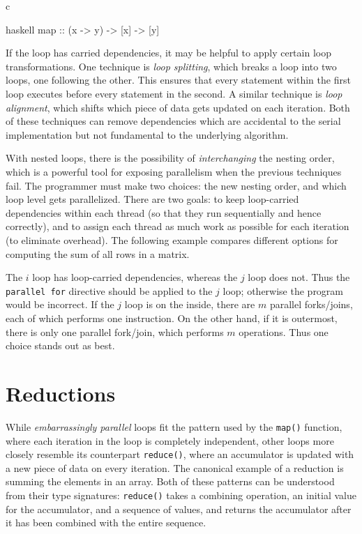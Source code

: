 \documentclass[conference, a4paper]{IEEEtran-modified}
\begin{document}
\begin{ccode}[]{c}
        \begin{ccode}[]
        {haskell}
        map :: (x -> y) -> [x] -> [y]\end{ccode}

If the loop has carried dependencies, it may be helpful to apply certain loop transformations. One technique is \emph{loop splitting}, which breaks a loop into two loops, one following the other. This ensures that every statement within the first loop executes before every statement in the second. A similar technique is \emph{loop alignment}, which shifts which piece of data gets updated on each iteration. Both of these techniques can remove dependencies which are accidental to the serial implementation but not fundamental to the underlying algorithm.

  With nested loops, there is the possibility of \emph{interchanging} the nesting order, which is a powerful tool for exposing parallelism when the previous techniques fail. The programmer must make two choices: the new nesting order, and which loop level gets parallelized. There are two goals: to keep loop-carried dependencies within each thread (so that they run sequentially and hence correctly), and to assign each thread as much work as possible for each iteration (to eliminate overhead). The following example compares different options for computing the sum of all rows in a matrix.



  The $i$ loop has loop-carried dependencies, whereas the $j$ loop does not. Thus the \texttt{parallel for} directive should be applied to the $j$ loop; otherwise the program would be incorrect. If the $j$ loop is on the inside, there are $m$ parallel forks/joins, each of which performs one instruction. On the other hand, if it is outermost, there is only one parallel fork/join, which performs $m$ operations. Thus one choice stands out as best.


\section{Reductions}

While \emph{embarrassingly parallel} loops fit the pattern used by the \texttt{map()} function, where each iteration in the loop is completely independent, other loops more closely resemble its counterpart \texttt{reduce()}, where an accumulator is updated with a new piece of data on every iteration. The canonical example of a reduction is summing the elements in an array. Both of these patterns can be understood from their type signatures: \texttt{reduce()} takes a combining operation, an initial value for the accumulator, and a sequence of values, and returns the accumulator after it has been combined with the entire sequence.


\end{ccode}
\end{document}
